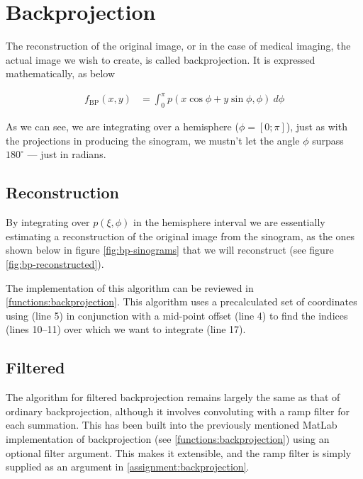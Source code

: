 %
%

\newpage
\section{Backprojection}
The reconstruction of the original image, or in the case of medical imaging,
the actual image we wish to create, is called backprojection. It is expressed
mathematically, as below

\begin{align}
    \label{eqn:backprojection}
    f_{\text{BP}}(x,y)
    &= \int_{0}^{\pi} p(x \cos \phi + y \sin \phi, \phi)
    {\ }d\phi
\end{align}

As we can see, we are integrating over a hemisphere ($\phi = [0;\pi]$), just
as with the projections in producing the sinogram, we mustn't let the angle
$\phi$ surpass $180^\circ$ --- just in radians.

\subsection{Reconstruction}
By integrating over $p(\xi,\phi)$ in the hemisphere interval we are
essentially estimating a reconstruction of the original image from the
sinogram, as the ones shown below in figure \ref{fig:bp-sinograms} that we
will reconstruct (see figure \ref{fig:bp-reconstructed}).


The implementation of this algorithm can be reviewed in
\ref{functions:backprojection}. This algorithm uses a precalculated set of
coordinates using  (line 5) in conjunction with a mid-point
offset (line 4) to find the indices (lines 10--11) over which we want to
integrate (line 17).


\subsection{Filtered}
The algorithm for filtered backprojection remains largely the same as that of
ordinary backprojection, although it involves convoluting with a ramp filter
for each summation. This has been built into the previously mentioned MatLab
implementation of backprojection (see \ref{functions:backprojection}) using an
optional filter argument. This makes it extensible, and the ramp filter is
simply supplied as an argument in \ref{assignment:backprojection}.

